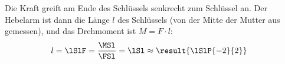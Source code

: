 Die Kraft greift am Ende des Schlüssels senkrecht zum Schlüssel an. Der Hebelarm ist dann die Länge $l$ des Schlüssels (von der Mitte der Mutter aus gemessen), und das Drehmoment ist $M = F\cdot l$:
\begin{align}
 l &= \lSlF = \frac{\MSl}{\FSl} = \lSl \approx \result{\lSlP{-2}{2}}
\end{align}
